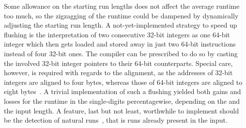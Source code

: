 Some allowance on the starting run lengths does not affect the average runtime too much, so the zigzagging of the runtime could be dampened by dynamically adjusting the starting run length.
A not-yet-implemented strategy to speed up flushing is the interpretation of two consecutive 32-bit integers as one 64-bit integer which then gets loaded and stored away in just two 64-bit instructions instead of four 32-bit ones.
The compiler can be prescribed to do so by casting the involved 32-bit integer pointers to their 64-bit counterparts.
Special care, however, is required with regards to the alignment, as the addresses of 32-bit integers are aligned to four bytes, whereas those of 64-bit integers are aligned to eight bytes~\cite[DPU ABI -- Data types]{upmemSDK}.
A trivial implementation of such a flushing yielded both gains and losses for the runtime in the single-digits percentagewise, depending on the \MS{} and the input length.
A feature, last but not least, worthwhile to implement should be the detection of natural runs~\cites[Chapter~2.6]{lang2009algorithmen}[Chapter~2.3.2]{wirth1975algorithmen}, that is runs already present in the input.

